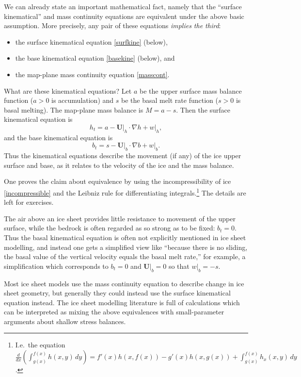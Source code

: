 \documentclass[titlepage,letterpaper,final,12pt]{scrartcl}
\newcommand{\grad}{\nabla}
\begin{document}
We can already state an important mathematical fact, namely that the ``surface kinematical'' and mass continuity equations are equivalent under the above basic assumption.  More precisely, any pair of these equations \emph{implies the third}:
  \begin{itemize}
  \item the surface kinematical equation \eqref{surfkine} (below),
  \item the base kinematical equation \eqref{basekine} (below), and
  \item the map-plane mass continuity equation \eqref{masscont}.
  \end{itemize}

What are these kinematical equations?  Let $a$ be the upper surface mass balance function ($a>0$ is accumulation) and $s$ be the basal melt rate function ($s>0$ is basal melting).  The map-plane mass balance is $M=a-s$.  Then the surface kinematical equation is 
\begin{equation}
h_t = a - \mathbf{U}\big|_h \cdot \grad h + w\big|_h,  \label{surfkine}
\end{equation}
and the base kinematical equation is
\begin{equation}
b_t = s - \mathbf{U}\big|_b \cdot \grad b + w\big|_b.  \label{basekine}
\end{equation}
Thus the kinematical equations describe the movement (if any) of the ice upper surface and base, as it relates to the velocity of the ice and the mass balance.

One proves the claim about equivalence by using the incompressibility of ice \eqref{incompressible} and the Leibniz rule for differentiating integrals.\footnote{I.e.~the equation $\frac{d}{dx}\left(\int_{g(x)}^{f(x)} h(x,y)\,dy\right) = f'(x) h(x,f(x)) - g'(x) h(x,g(x)) + \int_{g(x)}^{f(x)} h_x(x,y)\,dy$.}  The details are left for exercises.

The air above an ice sheet provides little resistance to movement of the upper surface, while the bedrock is often regarded as so strong as to be fixed: $b_t=0$.  Thus the basal kinematical equation is often not explicitly mentioned in ice sheet modelling, and instead one gets a simplified view like ``because there is no sliding, the basal value of the vertical velocity equals the basal melt rate,'' for example, a simplification which corresponds to $b_t=0$ and $\mathbf{U}\big|_b=0$ so that $w\big|_b=-s$.

Most ice sheet models use the mass continuity equation to describe change in ice sheet geometry, but generally they could instead use the surface kinematical equation instead.  The ice sheet modelling literature is full of calculations which can be interpreted as mixing the above equivalences with small-parameter arguments about shallow stress balances.
\end{document}
